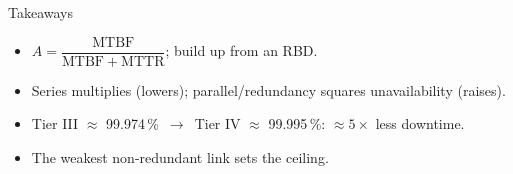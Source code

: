 \begin{frame}{Takeaways}
  \begin{itemize}
    \setlength{\itemsep}{0.5em}
    \item $A = \dfrac{\mathrm{MTBF}}{\mathrm{MTBF}+\mathrm{MTTR}}$; build up from an RBD.
    \item Series multiplies (lowers); parallel/redundancy squares unavailability (raises).
    \item Tier III $\approx$ 99.974\,\% $\,\to\,$ Tier IV $\approx$ 99.995\,\%: $\approx 5\times$ less downtime.
    \item The weakest non-redundant link sets the ceiling.
  \end{itemize}
\end{frame}
